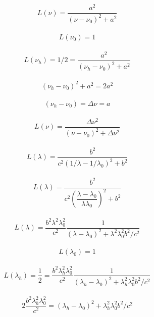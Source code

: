 \begin{align}
	L(\nu) = \dfrac{a^2}{ (\nu - \nu_0)^2 + a^2}
\end{align}

\begin{align}
	L(\nu_0) = 1
\end{align}

\begin{align}
	L(\nu_h) = 1/2  = \dfrac{a^2}{ (\nu_h - \nu_0)^2 + a^2}
\end{align}

\begin{align}
	 (\nu_h - \nu_0)^2 + a^2 = 2 a^2
\end{align}

\begin{align}
	(\nu_h - \nu_0) = \Delta \nu = a
\end{align}

\begin{align}
	L(\nu) = \dfrac{\Delta \nu^2}{ (\nu - \nu_0)^2 + \Delta \nu^2}
\end{align}

\begin{align}
	L(\lambda) = \dfrac{b^2}{ c^2(1/\lambda - 1/\lambda_0)^2 + b^2}
\end{align}

\begin{align}
	L(\lambda) = \dfrac{b^2}{ c^2 \left(\dfrac{\lambda - \lambda_0}{\lambda  \lambda_0}\right)^2 + b^2}
\end{align}

\begin{align}
	L(\lambda) = \dfrac{b^2 \lambda^2 \lambda_0^2}{c^2}
				\dfrac{1}{\left(\lambda - \lambda_0\right)^2 + \lambda^2 \lambda_0^2 b^2/c^2}
\end{align}

\begin{align}
	L(\lambda_0) = 1
\end{align}

\begin{align}
	L(\lambda_h) = \dfrac{1}{2} = \dfrac{b^2 \lambda_h^2 \lambda_0^2}{c^2}
\dfrac{1}{\left(\lambda_h - \lambda_0\right)^2 + \lambda_h^2 \lambda_0^2 b^2/c^2}
\end{align}

\begin{align}
	 2 \dfrac{b^2 \lambda_h^2 \lambda_0^2}{c^2}
				= \left(\lambda_h - \lambda_0\right)^2 + \lambda_h^2 \lambda_0^2 b^2/c^2
\end{align}


